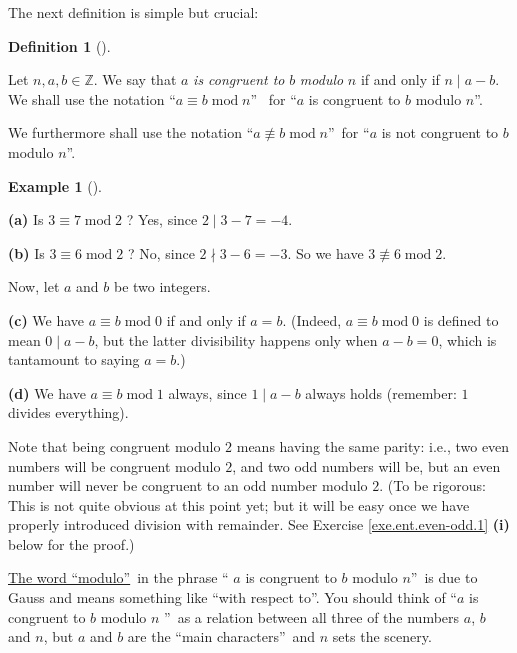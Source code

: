 \documentclass[numbers=enddot,12pt,final,onecolumn,notitlepage]{scrartcl}%
\numberwithin{exer}{subsection}
\theoremstyle{definition}
\newtheorem{defi}[theo]{Definition}
\newenvironment{definition}[1][]
{\begin{defi}[#1]\begin{leftbar}}
{\end{leftbar}\end{defi}}
\newtheorem{exam}[theo]{Example}
\newenvironment{example}[1][]
{\begin{exam}[#1]\begin{leftbar}}
{\end{leftbar}\end{exam}}
\begin{document}
The next definition is simple but crucial:

\begin{definition}
\label{def.ent.cong}Let $n,a,b\in\mathbb{Z}$. We say that $a$ \textit{is
congruent to }$b$ \textit{modulo }$n$ if and only if $n\mid a-b$. We shall use
the notation \textquotedblleft$a\equiv b\operatorname{mod}n$\textquotedblright%
\ for \textquotedblleft$a$ is congruent to $b$ modulo $n$\textquotedblright.

We furthermore shall use the notation \textquotedblleft$a\not \equiv
b\operatorname{mod}n$\textquotedblright\ for \textquotedblleft$a$ is not
congruent to $b$ modulo $n$\textquotedblright.
\end{definition}

\begin{example}
\label{exa.ent.cong.triv}\textbf{(a)} Is $3\equiv7\operatorname{mod}2$ ? Yes,
since $2\mid3-7=-4$.

\textbf{(b)} Is $3\equiv6\operatorname{mod}2$ ? No, since $2\nmid3-6=-3$. So
we have $3\not \equiv 6\operatorname{mod}2$.

Now, let $a$ and $b$ be two integers.

\textbf{(c)} We have $a\equiv b\operatorname{mod}0$ if and only if $a=b$.
(Indeed, $a\equiv b\operatorname{mod}0$ is defined to mean $0\mid a-b$, but
the latter divisibility happens only when $a-b=0$, which is tantamount to
saying $a=b$.)

\textbf{(d)} We have $a\equiv b\operatorname{mod}1$ always, since $1\mid a-b$
always holds (remember: $1$ divides everything).
\end{example}

Note that being congruent modulo $2$ means having the same parity: i.e., two
even numbers will be congruent modulo $2$, and two odd numbers will be, but an
even number will never be congruent to an odd number modulo $2$. (To be
rigorous: This is not quite obvious at this point yet; but it will be easy
once we have properly introduced division with remainder. See Exercise
\ref{exe.ent.even-odd.1} \textbf{(i)} below for the proof.)

\href{https://en.wikipedia.org/wiki/Modulo_(jargon)}{The word
\textquotedblleft modulo\textquotedblright}\ in the phrase \textquotedblleft%
$a$ is congruent to $b$ modulo $n$\textquotedblright\ is due to Gauss and
means something like \textquotedblleft with respect to\textquotedblright. You
should think of \textquotedblleft$a$ is congruent to $b$ modulo $n$%
\textquotedblright\ as a relation between all three of the numbers $a$, $b$
and $n$, but $a$ and $b$ are the \textquotedblleft main
characters\textquotedblright\ and $n$ sets the scenery.
\end{document}
